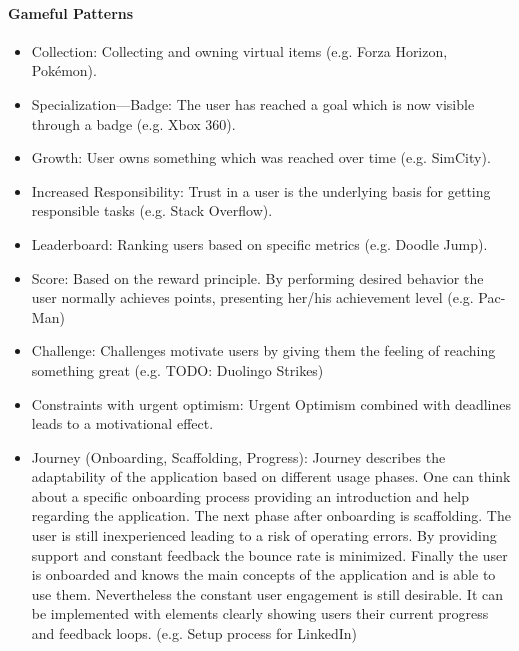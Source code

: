 \paragraph*{Gameful Patterns}
\label{GamefulPatterns}
\begin{itemize}
	\item Collection: Collecting and owning virtual items (e.g. Forza Horizon, Pokémon). \cite[p. 4, 35]{lewisIrresistibleAppsMotivational2014}
	\item Specialization—Badge: The user has reached a goal which is now visible through a badge (e.g. Xbox 360). \cite[p. 4, 37]{lewisIrresistibleAppsMotivational2014}
	\item Growth: User owns something which was reached over time (e.g. SimCity). \cite[p. 4, 40]{lewisIrresistibleAppsMotivational2014}
	\item Increased Responsibility: Trust in a user is the underlying basis for getting responsible tasks (e.g. Stack Overflow). \cite[p. 4, 41]{lewisIrresistibleAppsMotivational2014}
	\item Leaderboard: Ranking users based on specific metrics (e.g. Doodle Jump). \cite[p. 4, 44]{lewisIrresistibleAppsMotivational2014}
	\item Score: Based on the reward principle. By performing desired behavior the user normally achieves points, presenting her/his achievement level (e.g. Pac-Man) \cite[p. 4, 46]{lewisIrresistibleAppsMotivational2014}
	\item Challenge: Challenges motivate users by giving them the feeling of reaching something great (e.g. TODO: Duolingo Strikes) \cite[p. 77, 78]{inproceedings}
	\item Constraints with urgent optimism: Urgent Optimism combined with deadlines leads to a motivational effect.
	\item Journey (Onboarding, Scaffolding, Progress): Journey describes the adaptability of the application based on different usage phases. One can think about a specific onboarding process providing an introduction and help regarding the application. The next phase after onboarding is scaffolding. The user is still inexperienced leading to a risk of operating errors. By providing support and constant feedback the bounce rate is minimized. Finally the user is onboarded and knows the main concepts of the application and is able to use them. Nevertheless the constant user engagement is still desirable. It can be implemented with elements clearly showing users their current progress and feedback loops. (e.g. Setup process for LinkedIn) \cite[p. 80, 81, 82]{inproceedings}
\end{itemize}

